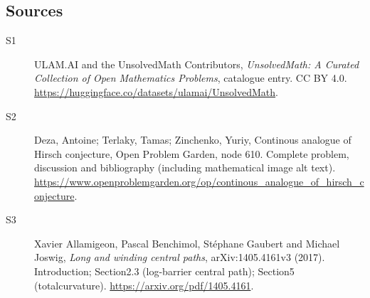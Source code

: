 \documentclass[11pt]{book}
\begin{document}
\subsection{Sources}
\begin{description}
\item[\hypertarget{source:statement:1}{S1}] ULAM.AI and the UnsolvedMath Contributors, \emph{UnsolvedMath: A Curated Collection of Open Mathematics Problems}, catalogue entry. CC BY 4.0. \url{https://huggingface.co/datasets/ulamai/UnsolvedMath}.
\item[\hypertarget{source:statement:2}{S2}] Deza, Antoine; Terlaky, Tamas; Zinchenko, Yuriy, Continous analogue of Hirsch conjecture, Open Problem Garden, node 610. Complete problem, discussion and bibliography (including mathematical image alt text). \url{https://www.openproblemgarden.org/op/continous_analogue_of_hirsch_conjecture}.
\item[\hypertarget{source:statement:3}{S3}] Xavier Allamigeon, Pascal Benchimol, Stéphane Gaubert and Michael Joswig, \emph{Long and winding central paths}, arXiv:1405.4161v3 (2017). Introduction; Section2.3 (log-barrier central path); Section5 (totalcurvature). \url{https://arxiv.org/pdf/1405.4161}.
\end{description}
\label{end:statement}
\end{document}
